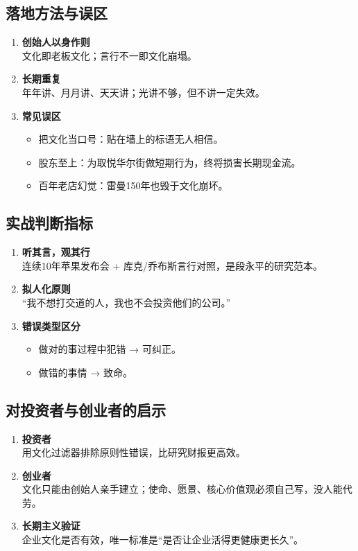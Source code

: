 \subsection{落地方法与误区}
\begin{enumerate}[leftmargin=*, nosep]
    \item \textbf{创始人以身作则}  \\
    文化即老板文化；言行不一即文化崩塌。
    \item \textbf{长期重复}  \\
    年年讲、月月讲、天天讲；光讲不够，但不讲一定失效。
    \item \textbf{常见误区}  \\
    \begin{itemize}[nosep]
        \item 把文化当口号：贴在墙上的标语无人相信。  
        \item 股东至上：为取悦华尔街做短期行为，终将损害长期现金流。  
        \item 百年老店幻觉：雷曼150年也毁于文化崩坏。
    \end{itemize}
\end{enumerate}

\subsection{实战判断指标}
\begin{enumerate}[leftmargin=*, nosep]
    \item \textbf{听其言，观其行}  \\
    连续10年苹果发布会 + 库克/乔布斯言行对照，是段永平的研究范本。
    \item \textbf{拟人化原则}  \\
    “我不想打交道的人，我也不会投资他们的公司。”
    \item \textbf{错误类型区分}  \\
    \begin{itemize}[nosep]
        \item 做对的事过程中犯错 → 可纠正。  
        \item 做错的事情 → 致命。
    \end{itemize}
\end{enumerate}

\subsection{对投资者与创业者的启示}
\begin{enumerate}[leftmargin=*, nosep]
    \item \textbf{投资者}  \\
    用文化过滤器排除原则性错误，比研究财报更高效。
    \item \textbf{创业者}  \\
    文化只能由创始人亲手建立；使命、愿景、核心价值观必须自己写，没人能代劳。
    \item \textbf{长期主义验证}  \\
    企业文化是否有效，唯一标准是“是否让企业活得更健康更长久”。
\end{enumerate}


